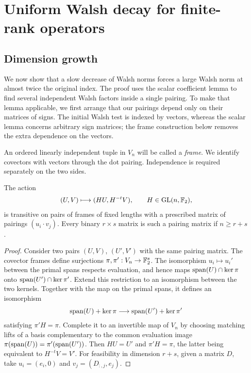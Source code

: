 \section{Uniform Walsh decay for finite-rank operators}\label{sec:walsh}

\subsection{Dimension growth}

We now show that a slow decrease of Walsh norms forces a large Walsh
norm at almost twice the original index. The proof uses the scalar
coefficient lemma to find several independent Walsh factors inside a
single pairing. To make that lemma applicable, we first arrange that
our pairings depend only on their matrices of signs. The initial Walsh
test is indexed by vectors, whereas the scalar lemma concerns arbitrary
sign matrices; the frame construction below removes the extra dependence
on the vectors.

An ordered linearly independent tuple in \(V_n\) will be called a
\emph{frame}. We identify covectors with vectors through the dot
pairing. Independence is required separately on the two sides.

\begin{lemma}\label{lem:frames}
The action
\[
(U,V)\longmapsto(HU,H^{-t}V),\qquad H\in\mathrm{GL}(n,\mathbb F_2),
\]
is transitive on pairs of frames of fixed lengths with a prescribed
matrix of pairings \((u_i\cdot v_j)\).
Every binary \(r\times s\) matrix is such a pairing matrix if
\(n\ge r+s\).
\end{lemma}
\begin{proof}
Consider two pairs \((U,V)\), \((U',V')\) with the same pairing
matrix. The covector frames define surjections
\(\pi,\pi':V_n\to\mathbb F_2^s\).
The isomorphism \(u_i\mapsto u_i'\) between the primal spans respects
evaluation, and hence maps
\(\operatorname{span}(U)\cap\ker\pi\) onto \(\operatorname{span}(U')\cap\ker\pi'\).
Extend this restriction to an isomorphism between the two kernels.
Together with the map on the primal spans, it defines an isomorphism
\[
\operatorname{span}(U)+\ker\pi\longrightarrow\operatorname{span}(U')+\ker\pi'
\]
satisfying \(\pi'H=\pi\).
Complete it to an invertible map of \(V_n\) by choosing matching
lifts of a basis complementary to the common evaluation image
\(\pi(\operatorname{span}(U))=\pi'(\operatorname{span}(U'))\).
Then \(HU=U'\) and \(\pi'H=\pi\), the latter being equivalent to
\(H^{-t}V=V'\).
For feasibility in dimension \(r+s\), given a matrix \(D\), take
\(u_i=(e_i,0)\) and \(v_j=(D_{:,j},e_j)\).
\end{proof}

